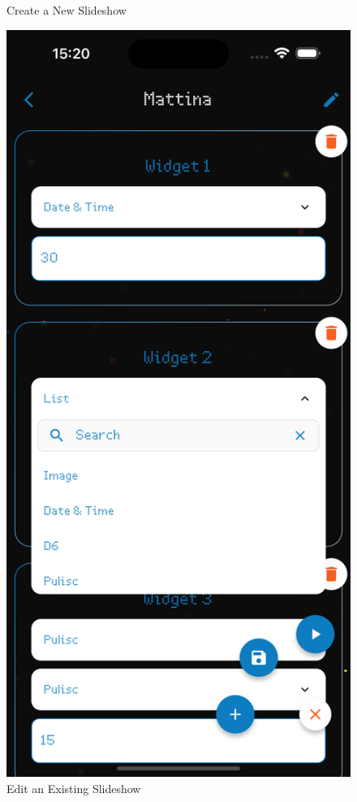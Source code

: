 \begin{figure}[h]
\begin{minipage}[b]{0.32\textwidth}
        \caption*{Create a New Slideshow}
    \end{minipage}
    \begin{minipage}[b]{0.32\textwidth}
        \centering
        \includegraphics[width=\textwidth]{tesi/img/client_demo/slideshows/edit.png}
        \caption*{Edit an Existing Slideshow}
    \end{minipage}
\end{figure}